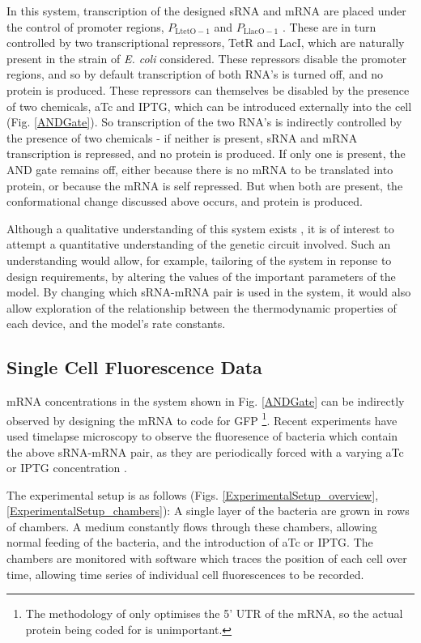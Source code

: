 \documentclass[10pt,journal]{./IEEE_latex_class/IEEEtran}
\begin{document}
In this system, transcription of the designed sRNA and mRNA are placed under the control of promoter regions, $P_{\mathrm{LtetO-1}}$ and $P_\mathrm{LlacO-1}$ \cite{Lutz1997}. These are in turn controlled by two transcriptional repressors, TetR and LacI, which are naturally present in the strain of \textit{E. coli} considered. These repressors disable the promoter regions, and so by default transcription of both RNA's is turned off, and no protein is produced. 
These repressors can themselves be disabled by the presence of two chemicals, aTc and IPTG, which can be introduced externally into the cell (Fig. \ref{ANDGate}).  So transcription of the two RNA's is indirectly controlled by the presence of two chemicals - if neither is present, sRNA and mRNA transcription is repressed, and no protein is produced. If only one is present, the AND gate remains off, either because there is no mRNA to be translated into protein, or because the mRNA is self repressed. But when both are present, the conformational change discussed above occurs, and protein is produced.

Although a qualitative understanding of this system exists \cite{Rodrigo2012}, it is of interest to attempt a quantitative understanding of the genetic circuit involved. Such an understanding would allow, for example, tailoring of the system in reponse to design requirements, by altering the values of the important parameters of the model. By changing which sRNA-mRNA pair is used in the system, it would also allow exploration of the relationship between the thermodynamic properties of each device, and the model's rate constants.
 
\subsection{Single Cell Fluorescence Data}

mRNA concentrations in the system shown in Fig. \ref{ANDGate} can be indirectly observed by designing the mRNA to code for GFP \footnote{ The methodology of \cite{Rodrigo2012} only optimises the 5' UTR of the mRNA, so the actual protein being coded for is unimportant.}. Recent experiments have used timelapse microscopy to observe the fluoresence of bacteria which contain the above sRNA-mRNA pair, as they are periodically forced with a varying aTc or IPTG concentration \cite{Jaramillo}. 

The experimental setup is as follows (Figs. \ref{ExperimentalSetup_overview},  \ref{ExperimentalSetup_chambers}): A single layer of the bacteria are grown in rows of chambers. A medium constantly flows through these chambers, allowing normal feeding of the bacteria, and the introduction of aTc or IPTG. The chambers are monitored with software which traces the position of each cell over time, allowing time series of individual cell fluorescences to be recorded.
\end{document}

